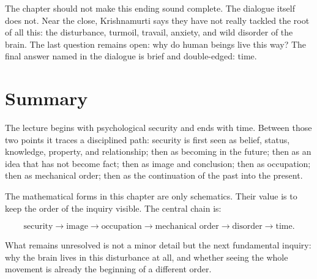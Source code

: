 The chapter should not make this ending sound complete. The dialogue itself does not. Near the close, Krishnamurti says they have not really tackled the root of all this: the disturbance, turmoil, travail, anxiety, and wild disorder of the brain. The last question remains open: why do human beings live this way? The final answer named in the dialogue is brief and double-edged: time.

\section{Summary}

The lecture begins with psychological security and ends with time. Between those two points it traces a disciplined path: security is first seen as belief, status, knowledge, property, and relationship; then as becoming in the future; then as an idea that has not become fact; then as image and conclusion; then as occupation; then as mechanical order; then as the continuation of the past into the present.

The mathematical forms in this chapter are only schematics. Their value is to keep the order of the inquiry visible. The central chain is:

\begin{equation}
\text{security}
\longrightarrow
\text{image}
\longrightarrow
\text{occupation}
\longrightarrow
\text{mechanical order}
\longrightarrow
\text{disorder}
\longrightarrow
\text{time}.
\end{equation}

What remains unresolved is not a minor detail but the next fundamental inquiry: why the brain lives in this disturbance at all, and whether seeing the whole movement is already the beginning of a different order.